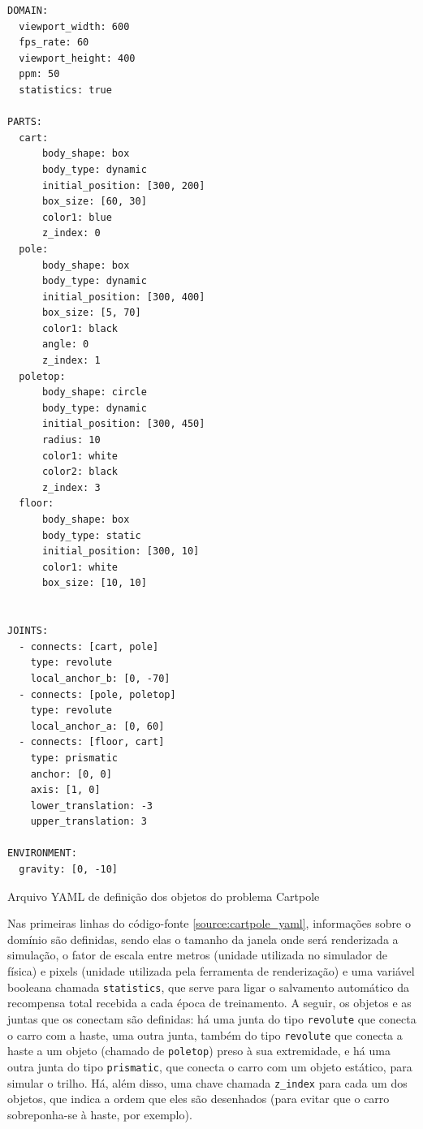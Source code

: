 \documentclass[cic,tc]{iiufrgs}
\newenvironment{longlisting}{\captionsetup{type=listing}}{}
\begin{document}
\begin{longlisting}
\begin{verbatim}
DOMAIN:
  viewport_width: 600
  fps_rate: 60
  viewport_height: 400
  ppm: 50
  statistics: true

PARTS:
  cart:
      body_shape: box
      body_type: dynamic
      initial_position: [300, 200]
      box_size: [60, 30]
      color1: blue
      z_index: 0
  pole:
      body_shape: box
      body_type: dynamic
      initial_position: [300, 400]
      box_size: [5, 70]
      color1: black
      angle: 0
      z_index: 1
  poletop:
      body_shape: circle
      body_type: dynamic
      initial_position: [300, 450]
      radius: 10
      color1: white
      color2: black
      z_index: 3
  floor:
      body_shape: box
      body_type: static
      initial_position: [300, 10]
      color1: white
      box_size: [10, 10]


JOINTS:
  - connects: [cart, pole]
    type: revolute
    local_anchor_b: [0, -70]
  - connects: [pole, poletop]
    type: revolute
    local_anchor_a: [0, 60]
  - connects: [floor, cart]
    type: prismatic
    anchor: [0, 0]
    axis: [1, 0]
    lower_translation: -3
    upper_translation: 3

ENVIRONMENT:
  gravity: [0, -10]
\end{verbatim}
\caption[Cópia de DNA]{Arquivo YAML de definição dos objetos do problema Cartpole}
\label{source:cartpole_yaml}
\end{longlisting}

Nas primeiras linhas do código-fonte \ref{source:cartpole_yaml}, informações
sobre o domínio são definidas, sendo elas o tamanho da janela onde será
renderizada a simulação, o fator de escala entre metros (unidade utilizada no
simulador de física) e pixels (unidade utilizada pela ferramenta de renderização)
e uma variável booleana chamada \texttt{statistics}, que serve para ligar o salvamento
automático da recompensa total recebida a cada época de treinamento. A seguir,
 os objetos e as juntas que os
conectam são definidas: há uma junta do tipo \texttt{revolute} que conecta o
carro com a haste, uma outra junta, também do tipo \texttt{revolute} que conecta
 a haste a um objeto (chamado de \texttt{poletop}) preso à sua
extremidade, e há uma outra junta do tipo \texttt{prismatic}, que conecta
o carro com um objeto estático, para simular o trilho. Há, além disso, uma
chave chamada \texttt{z\_index} para cada um dos objetos, que indica a ordem que
eles são desenhados (para evitar que o carro sobreponha-se à haste, por exemplo).
\end{document}
